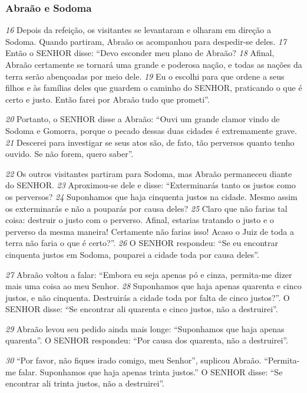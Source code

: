 \bigskip   
\subsubsection*{Abraão e Sodoma}
\textit{\tiny 16}
Depois da refeição, os visitantes se levantaram e olharam em direção a Sodoma.
Quando partiram, Abraão os acompanhou para despedir-se deles.
\textit{\tiny 17}
Então o SENHOR disse: “Devo esconder meu plano de Abraão? 
\textit{\tiny 18}
Afinal,
Abraão certamente se tornará uma grande e poderosa nação, e todas as nações da
terra serão abençoadas por meio dele. 
\textit{\tiny 19}
Eu o escolhi para que ordene a seus
filhos e às famílias deles que guardem o caminho do SENHOR, praticando o que é
certo e justo. Então farei por Abraão tudo que prometi”.

\bigskip   
\textit{\tiny 20}
Portanto, o SENHOR disse a Abraão: “Ouvi um grande clamor vindo de Sodoma
e Gomorra, porque o pecado dessas duas cidades é extremamente grave.
\textit{\tiny 21}
Descerei para investigar se seus atos são, de fato, tão perversos quanto tenho
ouvido. Se não forem, quero saber”.

\bigskip   
\textit{\tiny 22}
Os outros visitantes partiram para Sodoma, mas Abraão permaneceu diante
do SENHOR. 
\textit{\tiny 23}
Aproximou-se dele e disse: “Exterminarás tanto os justos como os
perversos? 
\textit{\tiny 24}
Suponhamos que haja cinquenta justos na cidade. Mesmo assim os
exterminarás e não a pouparás por causa deles? 
\textit{\tiny 25}
Claro que não farias tal coisa:
destruir o justo com o perverso. Afinal, estarias tratando o justo e o perverso da
mesma maneira! Certamente não farias isso! Acaso o Juiz de toda a terra não faria
o que é certo?”.
\textit{\tiny 26}
O SENHOR respondeu: “Se eu encontrar cinquenta justos em Sodoma,
pouparei a cidade toda por causa deles”.

\bigskip   
\textit{\tiny 27}
Abraão voltou a falar: “Embora eu seja apenas pó e cinza, permita-me dizer
mais uma coisa ao meu Senhor. 
\textit{\tiny 28}
Suponhamos que haja apenas quarenta e cinco
justos, e não cinquenta. Destruirás a cidade toda por falta de cinco justos?”.
   O SENHOR disse: “Se encontrar ali quarenta e cinco justos, não a destruirei”.

\bigskip   
\textit{\tiny 29}
Abraão levou seu pedido ainda mais longe: “Suponhamos que haja apenas
quarenta”.
   O SENHOR respondeu: “Por causa dos quarenta, não a destruirei”.

\bigskip   
\textit{\tiny 30}
“Por favor, não fiques irado comigo, meu Senhor”, suplicou Abraão.
“Permita-me falar. Suponhamos que haja apenas trinta justos.”
   O SENHOR disse: “Se encontrar ali trinta justos, não a destruirei”.

